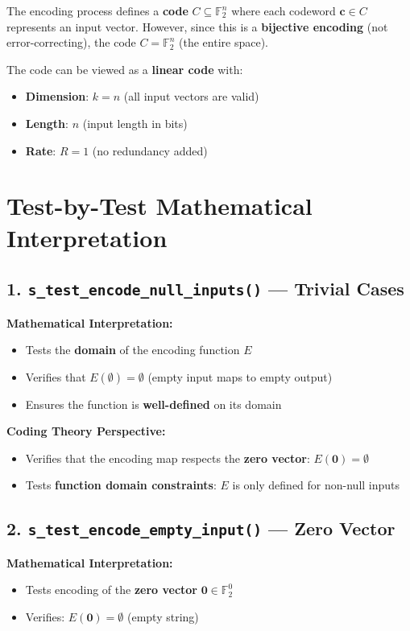 \documentclass[11pt,a4paper]{article}
\begin{document}
The encoding process defines a \textbf{code} $C \subseteq \mathbb{F}_2^n$ where each codeword $\mathbf{c} \in C$ represents an input vector. However, since this is a \textbf{bijective encoding} (not error-correcting), the code $C = \mathbb{F}_2^n$ (the entire space).

The code can be viewed as a \textbf{linear code} with:
\begin{itemize}
\item \textbf{Dimension}: $k = n$ (all input vectors are valid)
\item \textbf{Length}: $n$ (input length in bits)
\item \textbf{Rate}: $R = 1$ (no redundancy added)
\end{itemize}

\section{Test-by-Test Mathematical Interpretation}

\subsection{1. \texttt{s\_test\_encode\_null\_inputs()} --- Trivial Cases}

\textbf{Mathematical Interpretation:}
\begin{itemize}
\item Tests the \textbf{domain} of the encoding function $E$
\item Verifies that $E(\emptyset) = \emptyset$ (empty input maps to empty output)
\item Ensures the function is \textbf{well-defined} on its domain
\end{itemize}

\textbf{Coding Theory Perspective:}
\begin{itemize}
\item Verifies that the encoding map respects the \textbf{zero vector}: $E(\mathbf{0}) = \emptyset$
\item Tests \textbf{function domain constraints}: $E$ is only defined for non-null inputs
\end{itemize}

\subsection{2. \texttt{s\_test\_encode\_empty\_input()} --- Zero Vector}

\textbf{Mathematical Interpretation:}
\begin{itemize}
\item Tests encoding of the \textbf{zero vector} $\mathbf{0} \in \mathbb{F}_2^0$
\item Verifies: $E(\mathbf{0}) = \emptyset$ (empty string)
\end{itemize}
\end{document}
